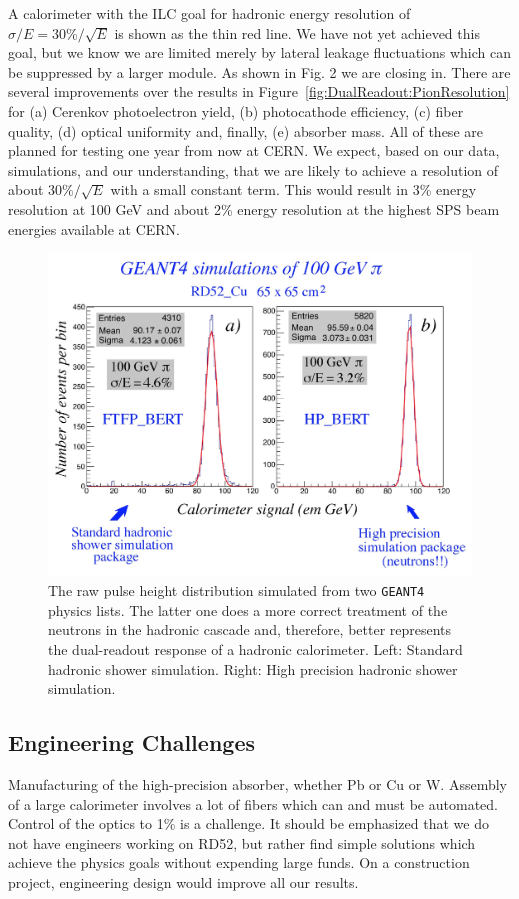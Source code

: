 A calorimeter with the ILC goal for hadronic energy resolution of
$\sigma/E = 30\%/\sqrt{E}$
is shown as the thin red line. We have not yet achieved this goal, but we know we are limited merely by lateral leakage fluctuations which can be suppressed by a larger module. As shown in Fig. 2 we are closing in.
There are several improvements over the results in Figure~\ref{fig:DualReadout:PionResolution} for (a) Cerenkov photoelectron yield, (b) photocathode efficiency, (c) fiber quality, (d) optical uniformity and, finally, (e) absorber mass. All of these are planned for testing one year from now at CERN. We expect,
based on our data, simulations, and our understanding, that we are likely to achieve a resolution of about $30\%/\sqrt{E}$ with a small constant term. This would result in 3\% energy resolution at 100 GeV and about 2\% energy resolution at the highest SPS beam energies available at CERN.
\begin{figure}
	\centering
	\includegraphics[width=.5\textwidth]{Calorimeter/DualReadout/pi-100GeV-geant}
	\caption{The raw pulse height distribution simulated from two \texttt{GEANT4} physics lists. The latter one does a more correct treatment of the neutrons in the hadronic cascade and, therefore, better represents the dual-readout response of a hadronic calorimeter. Left: Standard hadronic shower simulation. Right: High precision hadronic shower simulation.}
	\label{fig:DualReadout:PionResolutionNew}
\end{figure}
\subsection{Engineering Challenges}
Manufacturing of the high-precision absorber, whether Pb or Cu or W. Assembly of a large calorimeter involves a lot of fibers which can and must be automated. Control of the optics to 1\% is a challenge. It should be emphasized that we do not have engineers working on RD52, but rather find simple solutions which achieve the physics goals without expending large funds. On a construction project, engineering design would improve all our results.
